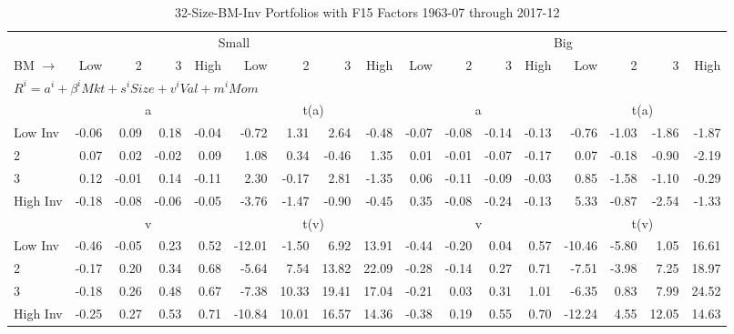 
\begin{table}[!ht]
\footnotesize
\centering
\caption{32-Size-BM-Inv Portfolios with F15 Factors 1963-07 through 2017-12}
\begin{tabular}{lrrrrrrrrrrrrrrrr}
  \toprule
    & \multicolumn{8}{c}{Small} & \multicolumn{8}{c}{Big} \\
      \cmidrule(r){2-9} \cmidrule(r){10-17}
    BM $\rightarrow$ & Low & 2 & 3 & High & Low & 2 & 3 & High & Low & 2 & 3 & High & Low & 2 & 3 & High \\ 
  \midrule
  \multicolumn{17}{l}{$R^i=a^i+\beta^iMkt+s^iSize+v^iVal+m^iMom$} \\

  
    
      & \multicolumn{4}{c}{a} & \multicolumn{4}{c}{t(a)}
    
      & \multicolumn{4}{c}{a} & \multicolumn{4}{c}{t(a)}
    
    \\
      \cmidrule(r){2-5} \cmidrule(r){6-9} \cmidrule(r){10-13} \cmidrule(r){14-17}

    Low Inv   & -0.06  & 0.09  & 0.18  & -0.04  & -0.72  & 1.31  & 2.64  & -0.48  & -0.07  & -0.08  & -0.14  & -0.13  & -0.76  & -1.03  & -1.86  & -1.87  \\
           2  & 0.07  & 0.02  & -0.02  & 0.09  & 1.08  & 0.34  & -0.46  & 1.35  & 0.01  & -0.01  & -0.07  & -0.17  & 0.07  & -0.18  & -0.90  & -2.19  \\
           3  & 0.12  & -0.01  & 0.14  & -0.11  & 2.30  & -0.17  & 2.81  & -1.35  & 0.06  & -0.11  & -0.09  & -0.03  & 0.85  & -1.58  & -1.10  & -0.29  \\
    High Inv  & -0.18  & -0.08  & -0.06  & -0.05  & -3.76  & -1.47  & -0.90  & -0.45  & 0.35  & -0.08  & -0.24  & -0.13  & 5.33  & -0.87  & -2.54  & -1.33  \\

  
    
      & \multicolumn{4}{c}{v} & \multicolumn{4}{c}{t(v)}
    
      & \multicolumn{4}{c}{v} & \multicolumn{4}{c}{t(v)}
    
    \\
      \cmidrule(r){2-5} \cmidrule(r){6-9} \cmidrule(r){10-13} \cmidrule(r){14-17}

    Low Inv   & -0.46  & -0.05  & 0.23  & 0.52  & -12.01  & -1.50  & 6.92  & 13.91  & -0.44  & -0.20  & 0.04  & 0.57  & -10.46  & -5.80  & 1.05  & 16.61  \\
           2  & -0.17  & 0.20  & 0.34  & 0.68  & -5.64  & 7.54  & 13.82  & 22.09  & -0.28  & -0.14  & 0.27  & 0.71  & -7.51  & -3.98  & 7.25  & 18.97  \\
           3  & -0.18  & 0.26  & 0.48  & 0.67  & -7.38  & 10.33  & 19.41  & 17.04  & -0.21  & 0.03  & 0.31  & 1.01  & -6.35  & 0.83  & 7.99  & 24.52  \\
    High Inv  & -0.25  & 0.27  & 0.53  & 0.71  & -10.84  & 10.01  & 16.57  & 14.36  & -0.38  & 0.19  & 0.55  & 0.70  & -12.24  & 4.55  & 12.05  & 14.63  \\


\end{tabular}
\end{table}
